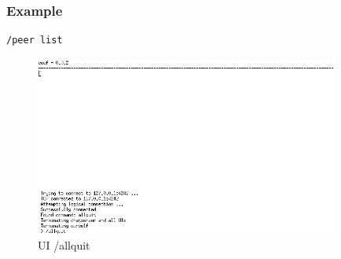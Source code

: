 \subsubsection{Example}
\begin{verbatim}
/peer list
\end{verbatim}
% 
\begin{figure}
    \caption{UI /allquit}
    \label{allquit}
    \centering
    \includegraphics[width=10cm]{allquit.png}
\end{figure}

